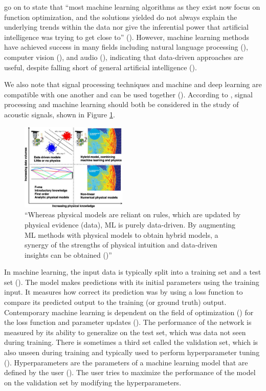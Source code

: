 \documentclass[report.tex]{subfiles}
\begin{document}
\citeauthor{introtodl} go on to state that ``most machine learning algorithms as they exist now focus on function optimization, and the solutions yielded do not always explain the underlying trends within the data nor give the inferential power that artificial intelligence was trying to get close to'' (\cite[1]{introtodl}). However, machine learning methods have achieved success in many fields including natural language processing (\cite{nlpml}), computer vision (\cite{cvml}), and audio (\cite{audiodeeplearning}), indicating that data-driven approaches are useful, despite falling short of general artificial intelligence (\cite{generalai}).

We also note that signal processing techniques and machine and deep learning are compatible with one another and can be used together (\cite{mlsp1, mlsp2}). According to \citeauthor{mldspmix}, signal processing and machine learning should both be considered in the study of acoustic signals, shown in Figure \ref{fig:dspmlmix}.

\begin{figure}[ht]
	\centering
	\includegraphics[width=0.45\textwidth]{./images-neural/dspmlmix.jpg}
	\caption{``Whereas physical models are reliant on rules, which are updated by physical evidence (data), ML is purely data-driven. By augmenting ML methods with physical models to obtain hybrid models, a synergy of the strengths of physical intuition and data-driven insights can be obtained (\cite[3591]{mldspmix})''}
	\label{fig:dspmlmix}
\end{figure}

In machine learning, the input data is typically split into a training set and a test set (\cite{introtoml}). The model makes predictions with its initial parameters using the training input. It measures how correct its prediction was by using a loss function to compare its predicted output to the training (or ground truth) output. Contemporary machine learning is dependent on the field of optimization (\cite{boyd2004convex, mlopt1, mlopt2}) for the loss function and parameter updates (\cite{sgd}). The performance of the network is measured by its ability to generalize on the test set, which was data not seen during training. There is sometimes a third set called the validation set, which is also unseen during training and typically used to perform hyperparameter tuning (\cite{splitvaliddata}). Hyperparameters are the parameters of a machine learning model that are defined by the user (\cite{introtodl}). The user tries to maximize the performance of the model on the validation set by modifying the hyperparameters.
\end{document}
